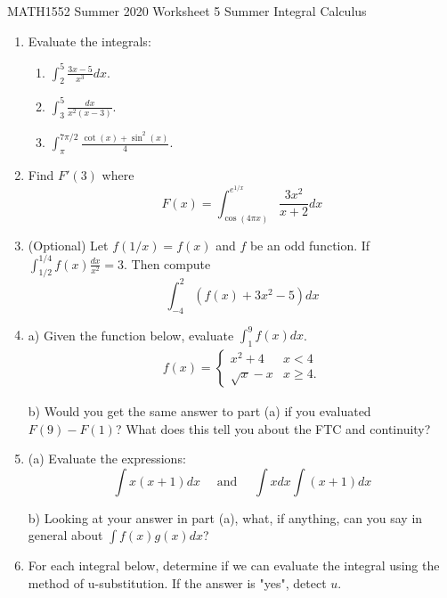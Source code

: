 \documentclass[12pt]{article}
\begin{document}
\noindent
MATH1552 Summer 2020
\hspace{2.2cm}
Worksheet 5 Summer
\hspace{2cm} Integral Calculus

\vspace{2mm}


\begin{enumerate}

\item Evaluate the integrals:

\begin{enumerate}
\item $\int_{2}^5 \frac{3x-5}{x^3}dx$.

\item $\int_{3}^5 \frac{dx}{x^2(x-3)}$.

\item $\int_{\pi}^{7\pi/2} \frac{\cot(x)+\sin^2(x)}{4}$.
\end{enumerate}


\item Find $F'(3)$ where
$$F(x) = \int_{\cos(4\pi x)}^{e^{1/x}} \frac{3x^2}{x+2} dx$$

\item (Optional) Let $f(1/x)=f(x)$ and  $f$ be an odd function. If $\int_{1/2}^{1/4} f(x)\frac{dx}{x^2} =3$. Then compute
$$\int_{-4}^2 (f(x)+3x^2 -5)dx$$

\item a) Given the function below, evaluate $\int_{1}^9 f(x)dx$. 
\begin{align*}
f(x)=\begin{cases}
x^2+4 & x<4\\
\sqrt{x} -x & x\geq 4.
\end{cases}
\end{align*}

b) Would you get the same answer to part (a) if you evaluated $F(9) -  F(1)$? What does
this tell you about the FTC and continuity?

\item (a) Evaluate the expressions:
$$\int x(x+1)dx \quad \text{ and }\quad \int xdx \int (x+1)dx$$

b) Looking at your answer in part (a), what, if anything, can you say in general about $\int f(x)g(x)dx$?

\item For each integral below, determine if we can evaluate the integral using the method of
u-substitution. If the answer is "yes", detect $u$.


\end{enumerate}
\end{document}
